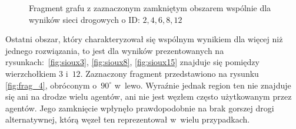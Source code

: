 \documentclass[twoside,12pt]{report}
\begin{document}
\begin{figure}[htbp]
\centering
{}
\caption{Fragment grafu z zaznaczonym zamkniętym obszarem wspólnie dla wyników sieci drogowych o ID: $2, 4, 6, 8, 12$}
\label{fig:frag_3}
\end{figure}

Ostatni obszar, który charakteryzował się wspólnym wynikiem dla więcej niż jednego rozwiązania, to jest dla wyników prezentowanych na rysunkach:~\ref{fig:sioux3}, \ref{fig:sioux8}, \ref{fig:sioux15} znajduje się pomiędzy wierzchołkiem $3$ i~$12$. Zaznaczony fragment przedstawiono na rysunku \ref{fig:frag_4}, obróconym o~$90^{\circ}$ w~lewo. Wyraźnie jednak region ten nie znajduje się ani na drodze wielu agentów, ani nie jest węzłem często użytkowanym przez agentów. Jego zamknięcie wpłynęło prawdopodobnie na brak gorszej drogi alternatywnej, którą węzeł ten reprezentował w~wielu przypadkach.
\end{document}
